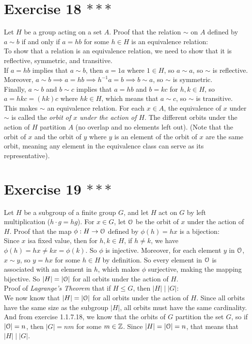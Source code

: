 \documentclass{article}
\begin{document}
    \section*{Exercise 18 $***$}
    Let $H$ be a group acting on a set $A$.
    Proof that the relation $\sim$ on $A$ defined by $a \sim b$ if and only
    if $a = hb$ for some $h \in H$ is an equivalence relation: \\
    To show that a relation is an equivalence relation,
    we need to show that it is reflective, symmetric, and transitive. \\
    If $a = hb$ implies that $a \sim b$,
    then $a = 1a$ where $1 \in H$,
    so $a \sim a$,
    so $\sim$ is reflective. \\
    Moreover,
    $a \sim b \implies a = hb \implies h^{-1}a = b \implies b \sim a$,
    so $\sim$ is symmetric. \\
    Finally, $a \sim b$ and $b \sim c$
    implies that $a = hb$ and $b = kc$ for $h, k \in H$,
    so $a = hkc = (hk)c$ where $hk \in H$,
    which means that $a \sim c$,
    so $\sim$ is transitive. \\
    This makes $\sim$ an equivalence relation.
    For each $x \in A$, the equivalence of $x$ under $\sim$ is called
    the \textit{orbit of $x$ under the action of $H$}.
    The different orbits under the action of $H$ partition $A$
    (no overlap and no elements left out).
    (Note that the orbit of $x$ and the orbit of $y$ where $y$ is
    an element of the orbit of $x$ are the same orbit, meaning any element
    in the equivalence class can serve as its representative).


    \section*{Exercise 19 $***$}
    Let $H$ be a subgroup of a finite group $G$,
    and let $H$ act on $G$ by left multiplication ($h \cdot g = hg$).
    For $x \in G$, let $\mathcal{O}$ be the orbit of $x$ under the action of $H$.
    Proof that the map $\phi: H \to \mathcal{O}$ defined by $\phi(h) = hx$
    is a bijection: \\
    Since $x$ isa fixed value,
    then for $h, k \in H$,
    if $h \neq k$,
    we have $\phi(h) = hx \neq kx = \phi(k)$.
    So $\phi$ is injective.
    Moreover, for each element $y$ in $\mathcal{O}$, $x \sim y$,
    so $y = hx$ for some $h \in H$ by definition.
    So every element in $\mathcal{O}$ is associated with an element in $h$,
    which makes $\phi$ surjective,
    making the mapping bijective.
    So $|H| = |\mathcal{O}|$ for all orbits under the action of $H$. \\
    Proof of \textit{Lagrange's Theorem} that if $H \leqslant G$,
    then $|H| \mid |G|$: \\
    We now know that $|H| = |\mathcal{O}|$ for all orbits under the action of $H$.
    Since all orbits have the same size as the subgroup $|H|$,
    all orbits must have the same cardinality.
    And from exercise 1.1.7.18,
    we know that the orbits of $G$ partition the set $G$,
    so if $|\mathcal{O}| = n$, then $|G| = nm$ for some $m \in \mathbb{Z}$.
    Since $|H| = |\mathcal{O}| = n$, that means that $|H| \mid |G|$.
\end{document}

